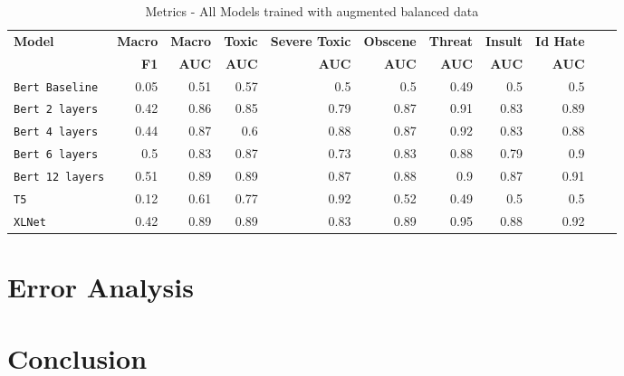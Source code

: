 \documentclass[11pt,a4paper]{article}
\begin{document}
\begin{table}
\centering
\begin{tabular}{lrrrrrrrrrr}
\hline
\textbf{Model} & \textbf{Macro} & \textbf{Macro} & \textbf{Toxic} & \textbf{Severe Toxic} & \textbf{Obscene} & \textbf{Threat} & \textbf{Insult} & \textbf{Id Hate}
\\
\textbf{ } & \textbf{F1} & \textbf{AUC} & \textbf{AUC} & \textbf{AUC} & \textbf{AUC} & \textbf{AUC} & \textbf{AUC} & \textbf{AUC}\\
\hline
\verb|Bert Baseline| & 0.05 & 0.51 & 0.57 & 0.5 & 0.5 & 0.49 & 0.5 & 0.5 \\
\verb|Bert 2 layers| & 0.42 & 0.86 & 0.85 & 0.79 & 0.87 & 0.91 & 0.83 & 0.89 \\
\verb|Bert 4 layers| & 0.44 & 0.87 & 0.6 & 0.88 & 0.87 & 0.92 & 0.83 & 0.88 \\
\verb|Bert 6 layers| & 0.5 & 0.83 & 0.87 & 0.73 & 0.83 & 0.88 & 0.79 & 0.9 \\
\verb|Bert 12 layers| & 0.51 & 0.89 & 0.89 & 0.87 & 0.88 & 0.9 & 0.87 & 0.91 \\
\verb|T5| & 0.12 & 0.61 & 0.77 & 0.92 & 0.52 & 0.49 & 0.5 & 0.5 \\
\verb|XLNet| & 0.42 & 0.89 & 0.89 & 0.83 & 0.89 & 0.95 & 0.88 & 0.92 \\
\hline
\end{tabular}
\caption{Metrics - All Models trained with augmented balanced data}
\label{table:BalResults}
\end{table}

\section{Error Analysis}

\section{Conclusion}



\end{document}
